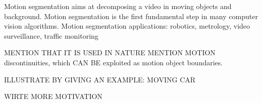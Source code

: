 Motion segmentation aims at decomposing a video in moving objects and background.
Motion segmentation is the first fundamental step in many computer vision algorithms.
Motion segmentation applications: robotics, metrology, video surveillance, traffic monitoring


MENTION THAT IT IS USED IN NATURE
MENTION MOTION discontinuities, which CAN BE exploited as motion object boundaries.


ILLUSTRATE BY GIVING AN EXAMPLE: MOVING CAR

WIRTE MORE MOTIVATION


